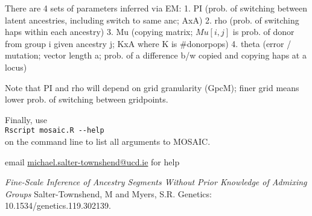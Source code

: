 \documentclass{article}
\begin{document}
There are 4 sets of parameters inferred via EM:
	1. PI (prob. of switching between latent ancestries, including switch to same anc; AxA)
	2. rho (prob. of switching haps within each ancestry)
	3. Mu (copying matrix; $Mu[i,j]$ is  prob. of donor from group i given ancestry j; KxA where K is \#donorpops) 
	4. theta (error / mutation; vector length a; prob. of a difference b/w copied and copying haps at a locus)

Note that PI and rho will depend on grid granularity (GpcM); finer grid means lower prob. of switching between gridpoints.

Finally, use \\
\verb+Rscript mosaic.R --help+\\
on the command line to list all arguments to MOSAIC. 


email \url{michael.salter-townshend@ucd.ie} for help


\begin{thebibliography}{2}

    \textit{Fine-Scale Inference of Ancestry Segments Without Prior Knowledge of Admixing Groups}
{Salter-Townshend, M {\rm and} Myers, S.R.}
    Genetics: 10.1534/genetics.119.302139.

\end{thebibliography}
\end{document}
